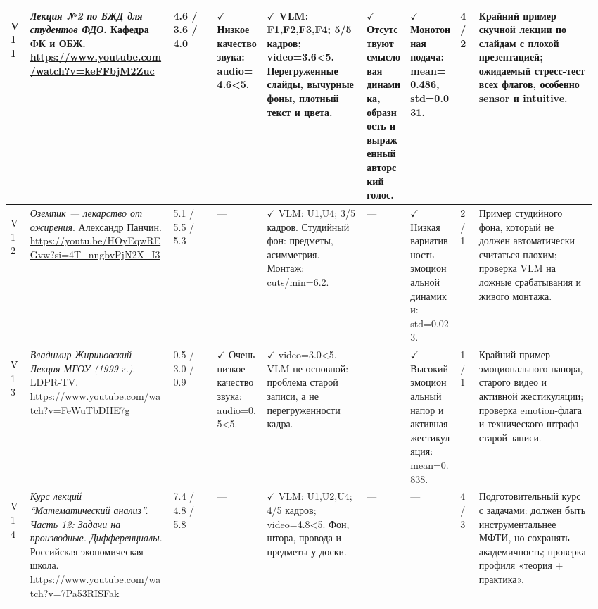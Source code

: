\begin{landscape}
\begin{longtable}{
L{0.035\linewidth}
L{0.235\linewidth}|
L{0.075\linewidth}|
L{0.085\linewidth}
L{0.160\linewidth}
L{0.070\linewidth}
L{0.085\linewidth}|
L{0.035\linewidth}|
L{0.190\linewidth}
}
\midrule

\hypertarget{vid:v11}{V11} &
\textit{Лекция №2 по БЖД для студентов ФДО}. Кафедра ФК и ОБЖ. {\tiny\url{https://www.youtube.com/watch?v=keFFbjM2Zuc}} &
4.6 / 3.6 / 4.0 &
$\checkmark$ Низкое качество звука: audio=4.6<5.&
$\checkmark$ VLM: F1,F2,F3,F4; 5/5 кадров; video=3.6<5. Перегруженные слайды, вычурные фоны, плотный текст и цвета. &
$\checkmark$ Отсутствуют смысловая динамика, образность и выраженный авторский голос. &
$\checkmark$ Монотонная подача: mean=0.486, std=0.031.&
4 / 2 &
Крайний пример скучной лекции по слайдам с плохой презентацией; ожидаемый стресс-тест всех флагов, особенно sensor и intuitive. \\

\midrule

\hypertarget{vid:v12}{V12} &
\textit{Оземпик — лекарство от ожирения}. Александр Панчин. {\tiny\url{https://youtu.be/HOyEqwREGvw?si=4T_nngbvPjN2X_I3}} &
5.1 / 5.5 / 5.3 &
--- &
$\checkmark$ VLM: U1,U4; 3/5 кадров. Студийный фон: предметы, асимметрия. Монтаж: cuts/min=6.2. &
--- &
$\checkmark$ Низкая вариативность эмоциональной динамики: std=0.023. &
2 / 1 &
Пример студийного фона, который не должен автоматически считаться плохим; проверка VLM на ложные срабатывания и живого монтажа. \\

\midrule

\hypertarget{vid:v13}{V13} &
\textit{Владимир Жириновский — Лекция МГОУ (1999 г.)}. LDPR-TV. {\tiny\url{https://www.youtube.com/watch?v=FeWuTbDHE7g}} &
0.5 / 3.0 / 0.9 &
$\checkmark$ Очень низкое качество звука: audio=0.5<5. &
$\checkmark$ video=3.0<5. VLM не основной: проблема старой записи, а не перегруженности кадра. &
--- &
$\checkmark$ Высокий эмоциональный напор и активная жестикуляция: mean=0.838. &
1 / 1 &
Крайний пример эмоционального напора, старого видео и активной жестикуляции; проверка emotion-флага и технического штрафа старой записи. \\

\midrule

\hypertarget{vid:v14}{V14} &
\textit{Курс лекций ``Математический анализ''. Часть 12: Задачи на производные. Дифференциалы}. Российская экономическая школа. {\tiny\url{https://www.youtube.com/watch?v=7Pa53RISFak}} &
7.4 / 4.8 / 5.8 &
--- &
$\checkmark$ VLM: U1,U2,U4; 4/5 кадров; video=4.8<5. Фон, штора, провода и предметы у доски. &
--- &
--- &
4 / 3 &
Подготовительный курс с задачами: должен быть инструментальнее МФТИ, но сохранять академичность; проверка профиля «теория + практика». \\


\end{longtable}
\end{landscape}
